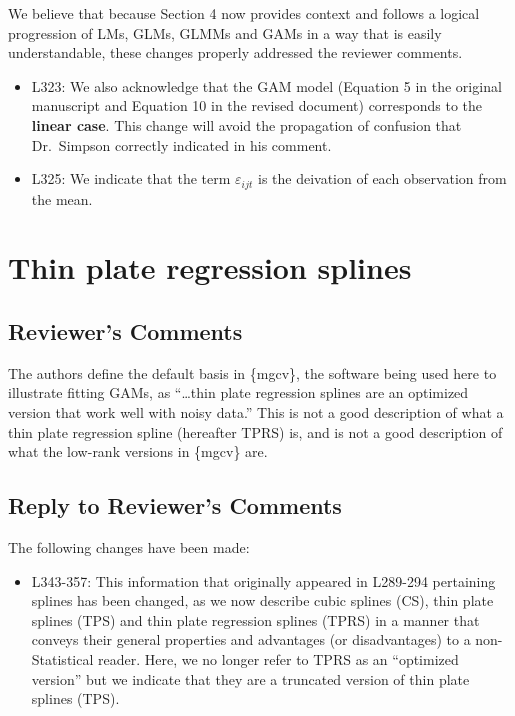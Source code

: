 \documentclass[
]{article}
\providecommand{\tightlist}{%
  \setlength{\itemsep}{0pt}\setlength{\parskip}{0pt}}
\begin{document}
We believe that because Section 4 now provides context and follows a logical progression of LMs, GLMs, GLMMs and GAMs in a way that is easily understandable, these changes properly addressed the reviewer comments.

\begin{itemize}
\item
  L323: We also acknowledge that the GAM model (Equation 5 in the original manuscript and Equation 10 in the revised document) corresponds to the \textbf{linear case}. This change will avoid the propagation of confusion that Dr.~Simpson correctly indicated in his comment.
\item
  L325: We indicate that the term \(\varepsilon_{ijt}\) is the deivation of each observation from the mean.
\end{itemize}

\hypertarget{thin-plate-regression-splines}{%
\section{Thin plate regression splines}\label{thin-plate-regression-splines}}

\hypertarget{reviewers-comments-3}{%
\subsection{Reviewer's Comments}\label{reviewers-comments-3}}

The authors define the default basis in \{mgcv\}, the software being used here to illustrate fitting GAMs, as ``\ldots thin plate regression splines are an optimized version that work well with noisy data.'' This is not a good description of what a thin plate regression spline (hereafter TPRS) is, and is not a good description of what the low-rank versions in \{mgcv\} are.

\hypertarget{section-4}{%
\subsection{\texorpdfstring{\textcolor{reviewersblue} {Reply to Reviewer's Comments}}{}}\label{section-4}}

The following changes have been made:

\begin{itemize}
\tightlist
\item
  L343-357: This information that originally appeared in L289-294 pertaining splines has been changed, as we now describe cubic splines (CS), thin plate splines (TPS) and thin plate regression splines (TPRS) in a manner that conveys their general properties and advantages (or disadvantages) to a non-Statistical reader. Here, we no longer refer to TPRS as an ``optimized version'' but we indicate that they are a truncated version of thin plate splines (TPS).
\end{itemize}
\end{document}
